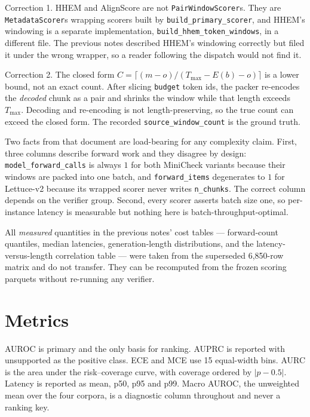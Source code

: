 \documentclass[10pt,a4paper]{article}
\newcommand{\fix}[1]{\textcolor{red!65!black}{#1}}
\begin{document}
\fix{Correction 1.} HHEM and AlignScore are not \texttt{PairWindowScorer}s. They are
\texttt{MetadataScorer}s wrapping scorers built by \texttt{build\_primary\_scorer}, and HHEM's
windowing is a separate implementation, \texttt{build\_hhem\_token\_windows}, in a different
file. The previous notes described HHEM's windowing correctly but filed it under the wrong
wrapper, so a reader following the dispatch would not find it.

\fix{Correction 2.} The closed form
$C=\lceil (m-o)/(T_{\max}-E(b)-o)\rceil$ is a lower bound, not an exact count. After slicing
\texttt{budget} token ids, the packer re-encodes the \emph{decoded} chunk as a pair and shrinks
the window while that length exceeds $T_{\max}$. Decoding and re-encoding is not
length-preserving, so the true count can exceed the closed form. The recorded
\texttt{source\_window\_count} is the ground truth.

Two facts from that document are load-bearing for any complexity claim. First, three columns
describe forward work and they disagree by design: \texttt{model\_forward\_calls} is always $1$
for both MiniCheck variants because their windows are packed into one batch, and
\texttt{forward\_items} degenerates to $1$ for Lettuce-v2 because its wrapped scorer never writes
\texttt{n\_chunks}. The correct column depends on the verifier group. Second, every scorer
asserts batch size one, so per-instance latency is measurable but nothing here is
batch-throughput-optimal.

All \emph{measured} quantities in the previous notes' cost tables --- forward-count quantiles,
median latencies, generation-length distributions, and the latency-versus-length correlation
table --- were taken from the superseded 6{,}850-row matrix and do not transfer. They can be
recomputed from the frozen scoring parquets without re-running any verifier.

\section{Metrics}

AUROC is primary and the only basis for ranking. AUPRC is reported with unsupported as the
positive class. ECE and MCE use 15 equal-width bins. AURC is the area under the risk--coverage
curve, with coverage ordered by $|p-0.5|$. Latency is reported as mean, p50, p95 and p99. Macro
AUROC, the unweighted mean over the four corpora, is a diagnostic column throughout and never a
ranking key.
\end{document}
